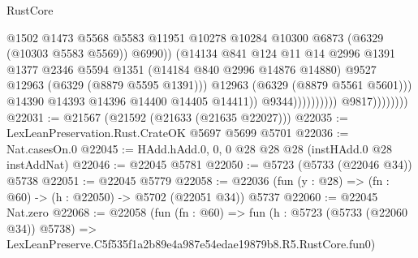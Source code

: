 \begin{lexlean}{RustCore}
\begin{coremodule}
                                                  @1502
                                                  @1473
                                                  @5568
                                                  @5583
                                                  @11951
                                                  @10278
                                                  @10284
                                                  @10300
                                                  @6873
                                                  (@6329 (@10303 @5583 @5569))
                                                  @6990))
                                              (@14134
                                                @841
                                                @124
                                                @11
                                                @14
                                                @2996
                                                @1391
                                                @1377
                                                @2346
                                                @5594
                                                @1351
                                                (@14184 @840 @2996 @14876 @14880)
                                                @9527
                                                @12963
                                                (@6329 (@8879 @5595 @1391)))
                                              @12963
                                              (@6329 (@8879 @5561 @5601)))
                                            @14390
                                            @14393
                                            @14396
                                            @14400
                                            @14405
                                            @14411))
                                        @9344))))))))))
                    @9817))))))))
@22031 := @21567 (@21592 (@21633 (@21635 @22027)))
@22035 := LexLeanPreservation.Rust.CrateOK @5697 @5699 @5701
@22036 := Nat.casesOn.{0}
@22045 := HAdd.hAdd.{0, 0, 0} @28 @28 @28 (instHAdd.{0} @28 instAddNat)
@22046 := @22045 @5781
@22050 := @5723 (@5733 (@22046 @34)) @5738
@22051 := @22045 @5779
@22058 := @22036 (fun (y : @28) => (fn : @60) -> (h : @22050) -> @5702 (@22051 @34)) @5737
@22060 := @22045 Nat.zero
@22068 := @22058
    (fun (fn : @60) =>
    fun (h : @5723 (@5733 (@22060 @34)) @5738) =>
    LexLeanPreserve.C5f535f1a2b89e4a987e54edae19879b8.R5.RustCore.fun0)

\end{coremodule}
\end{lexlean}
